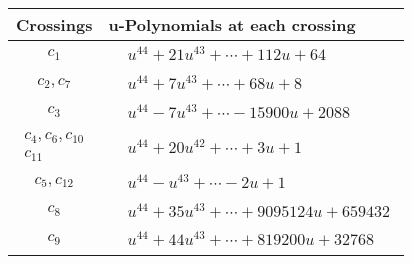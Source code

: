 \documentclass[1p]{elsarticle_modified}
\theoremstyle{definition}
\begin{document}
\begin{tabular}{m{50pt}|m{274pt}}
Crossings & \hspace{64pt}u-Polynomials at each crossing \\
\hline $$\begin{aligned}c_{1}\end{aligned}$$&$\begin{aligned}
&u^{44}+21 u^{43}+\cdots+112 u+64
\end{aligned}$\\
\hline $$\begin{aligned}c_{2},c_{7}\end{aligned}$$&$\begin{aligned}
&u^{44}+7 u^{43}+\cdots+68 u+8
\end{aligned}$\\
\hline $$\begin{aligned}c_{3}\end{aligned}$$&$\begin{aligned}
&u^{44}-7 u^{43}+\cdots-15900 u+2088
\end{aligned}$\\
\hline $$\begin{aligned}c_{4},c_{6},c_{10}\\c_{11}\end{aligned}$$&$\begin{aligned}
&u^{44}+20 u^{42}+\cdots+3 u+1
\end{aligned}$\\
\hline $$\begin{aligned}c_{5},c_{12}\end{aligned}$$&$\begin{aligned}
&u^{44}- u^{43}+\cdots-2 u+1
\end{aligned}$\\
\hline $$\begin{aligned}c_{8}\end{aligned}$$&$\begin{aligned}
&u^{44}+35 u^{43}+\cdots+9095124 u+659432
\end{aligned}$\\
\hline $$\begin{aligned}c_{9}\end{aligned}$$&$\begin{aligned}
&u^{44}+44 u^{43}+\cdots+819200 u+32768
\end{aligned}$\\
\hline
\end{tabular}\\~\\
\end{document}
